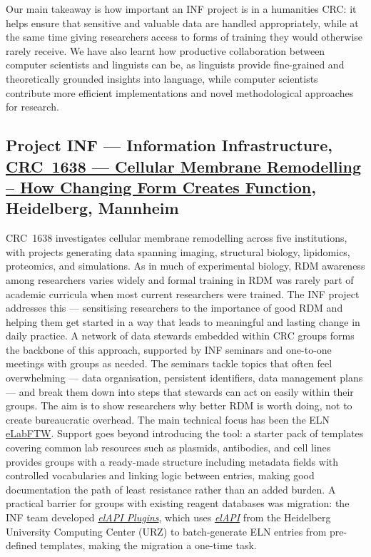 \documentclass{eceasst}
\begin{document}
Our main takeaway is how important an INF project is in a humanities CRC: it helps ensure that sensitive and valuable data are handled appropriately, while at the same time giving researchers access to forms of training they would otherwise rarely receive.
We have also learnt how productive collaboration between computer scientists and linguists can be, as linguists provide fine-grained and theoretically grounded insights into language, while computer scientists contribute more efficient implementations and novel methodological approaches for research.

\subsection{Project INF --- Information Infrastructure, \href{https://www.sfb1638.de/}{CRC~1638 --- Cellular Membrane Remodelling -- How Changing Form Creates Function}, Heidelberg, Mannheim}
CRC~1638 investigates cellular membrane remodelling across five institutions, with projects generating data spanning imaging, structural biology, lipidomics, proteomics, and simulations.
As in much of experimental biology, RDM awareness among researchers varies widely and formal training in RDM was rarely part of academic curricula when most current researchers were trained.
The INF project addresses this --- sensitising researchers to the importance of good RDM and helping them get started in a way that leads to meaningful and lasting change in daily practice.
A network of data stewards embedded within CRC groups forms the backbone of this approach, supported by INF seminars and one-to-one meetings with groups as needed.
The seminars tackle topics that often feel overwhelming --- data organisation, persistent identifiers, data management plans --- and break them down into steps that stewards can act on easily within their groups.
The aim is to show researchers why better RDM is worth doing, not to create bureaucratic overhead.
The main technical focus has been the ELN \href{https://www.elabftw.net/}{eLabFTW}.
Support goes beyond introducing the tool: a starter pack of templates covering common lab resources such as plasmids, antibodies, and cell lines provides groups with a ready-made structure including metadata fields with controlled vocabularies and linking logic between entries, making good documentation the path of least resistance rather than an added burden.
A practical barrier for groups with existing reagent databases was migration: the INF team developed \href{https://github.com/sfb1638/elAPI\_Plugins}{\textit{elAPI Plugins}}, which uses \href{https://github.com/uhd-urz/elAPI}{\textit{elAPI}} from the Heidelberg University Computing Center (URZ) to batch-generate ELN entries from pre-defined templates, making the migration a one-time task.
\end{document}
